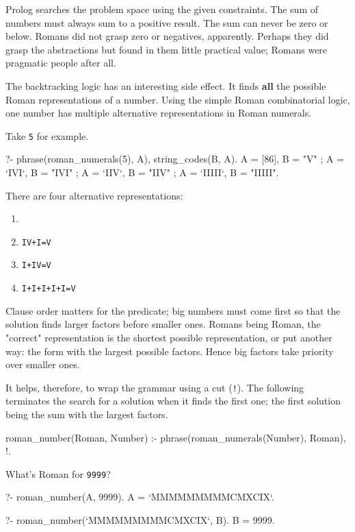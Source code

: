 Prolog searches the problem space using the given constraints. The sum
of numbers must always sum to a positive result. The sum can never be
zero or below. Romans did not grasp zero or negatives, apparently.
Perhaps they did grasp the abstractions but found in them little
practical value; Romans were pragmatic people after all.

The backtracking logic has an interesting side effect. It finds \textbf{all}
the possible Roman representations of a number. Using the simple Roman
combinatorial logic, one number has multiple alternative representations
in Roman numerals.

Take \verb$5$ for example.

\begin{code}
?- phrase(roman_numerals(5), A), string_codes(B, A).
A = [86],
B = "V" ;
A = `IVI`,
B = "IVI" ;
A = `IIV`,
B = "IIV" ;
A = `IIIII`,
B = "IIIII".
\end{code}

There are four alternative representations:

\begin{enumerate}
    \item {}
    \item \verb$IV+I=V$
    \item \verb$I+IV=V$
    \item \verb$I+I+I+I+I=V$
\end{enumerate}

Clause order matters for the  predicate; big numbers
must come first so that the solution finds larger factors before smaller
ones. Romans being Roman, the "correct" representation is the shortest
possible representation, or put another way: the form with the largest
possible factors. Hence big factors take priority over smaller ones.

It helps, therefore, to wrap the grammar using a cut (\verb$!$). The
following terminates the search for a solution when it finds the first
one; the first solution being the sum with the largest factors.

\begin{code}
roman_number(Roman, Number) :-
    phrase(roman_numerals(Number), Roman),
    !.
\end{code}

What's Roman for \verb$9999$?

\begin{code}
?- roman_number(A, 9999).
A = `MMMMMMMMMCMXCIX`.

?- roman_number(`MMMMMMMMMCMXCIX`, B).
B = 9999.
\end{code}

